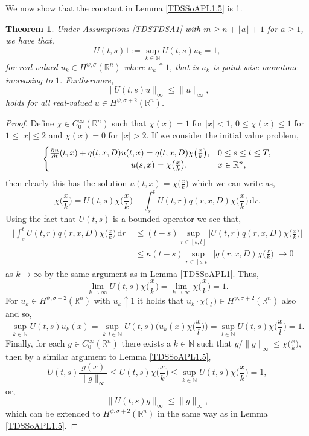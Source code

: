 \documentclass[a4paper, 12pt]{report}
\newtheorem{theorem}{Theorem}[section]
\theoremstyle{remark}
\theoremstyle{definition}
\begin{document}
We now show that the constant in Lemma \ref{TDSSoAPL1.5} is 1.
\begin{theorem}
Under Assumptions \ref{TDSTDSA1} with $m \ge n + \lfloor a \rfloor + 1$ for $a \ge 1$, we have that,
\begin{equation}
U(t, s)1 := \sup_{k \in \mathbb{N}}U(t, s)u_k = 1,
\end{equation}
for real-valued $u_k \in H^{\psi, \sigma}(\mathbb{R}^n)$ where $u_k \uparrow 1$, that is $u_k$ is point-wise monotone increasing to $1$.  Furthermore,
\begin{equation}\label{UBiSN}
\|U(t, s)u\|_\infty \le \|u\|_\infty,
\end{equation}
holds for all real-valued $u \in H^{\psi, \sigma + 2}(\mathbb{R}^n)$.
\end{theorem}
\begin{proof}
Define $\chi \in C_0^\infty(\mathbb{R}^n)$ such that $\chi(x) = 1$ for $|x| < 1$, $0 \le \chi(x) \le 1$ for $1 \le |x| \le 2$ and $\chi(x) = 0$ for $|x| > 2$.  If we consider the initial value problem,
$$
\begin{cases}
\frac{\partial u}{\partial t}(t, x) + q(t, x, D)u(t, x) = q(t, x, D)\chi\big(\frac{x}{k}\big), & 0 \le s \le t \le T,\\
\hspace{3.4cm} u(s, x) = \chi\big(\frac{x}{k}\big), & x \in \mathbb{R}^n,
\end{cases}
$$
then clearly this has the solution $u(t, x) = \chi\big(\frac{x}{k}\big)$ which we can write as,
$$
\chi\Big(\frac{x}{k}\Big) = U(t, s)\chi\Big(\frac{x}{k}\Big) + \int_s^tU(t, r)q(r, x, D)\chi\Big(\frac{x}{k}\Big)\,\mathrm{d}r.
$$
Using the fact that $U(t, s)$ is a bounded operator we see that,
$$
\begin{aligned}
\bigg|\int_s^tU(t, r)q(r, x, D)\chi\Big(\frac{x}{k}\Big)\,\mathrm{d}r\bigg| & \le (t - s)\sup_{r \in [s, t]}\Big|U(t, r)q(r, x, D)\chi\Big(\frac{x}{k}\Big)\Big|\\
& \le \kappa(t - s)\sup_{r \in [s, t]}\Big|q(r, x, D)\chi\Big(\frac{x}{k}\Big)\Big| \to 0
\end{aligned}
$$
as $k \to \infty$ by the same argument as in Lemma \ref{TDSSoAPL1}.  Thus,
$$
\lim_{k \to \infty}U(t, s)\chi\Big(\frac{x}{k}\Big) = \lim_{k \to \infty}\chi\Big(\frac{x}{k}\Big) = 1.
$$
For $u_k \in H^{\psi, \sigma + 2}(\mathbb{R}^n)$ with $u_k \uparrow 1$ it holds that $u_k \cdot \chi\big(\frac{\cdot}{l}\big) \in H^{\psi, \sigma + 2}(\mathbb{R}^n)$ also and so,
$$
\sup_{k \in \mathbb{N}}U(t, s)u_k(x) = \sup_{k, l \in \mathbb{N}}U(t, s)\bigg(u_k(x)\chi\Big(\frac{x}{l}\Big)\bigg) = \sup_{l \in \mathbb{N}}U(t, s)\chi\Big(\frac{x}{l}\Big) = 1.
$$
Finally, for each $g \in C_0^\infty(\mathbb{R}^n)$ there exists a $k \in \mathbb{N}$ such that $g/\|g\|_\infty \le \chi\big(\frac{x}{k}\big)$, then by a similar argument to Lemma \ref{TDSSoAPL1.5},
$$
U(t, s)\frac{g(x)}{\|g\|_\infty} \le U(t, s)\chi\Big(\frac{x}{k}\Big) \le \sup_{k \in \mathbb{N}}U(t, s)\chi\Big(\frac{x}{k}\Big) = 1,
$$
or,
$$
\|U(t, s)g\|_\infty \le \|g\|_\infty,
$$
which can be extended to $H^{\psi, \sigma + 2}(\mathbb{R}^n)$ in the same way as in Lemma \ref{TDSSoAPL1.5}.
\end{proof}
\end{document}
